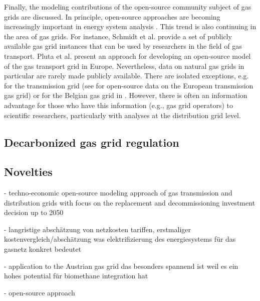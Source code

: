 Finally, the modeling contributions of the open-source community subject of gas grids are discussed. In principle, open-source approaches are becoming increasingly important in energy system analysis \cite{hulk2018transparency}. This trend is also continuing in the area of gas grids. For instance, Schmidt et al. \cite{schmidt2017gaslib} provide a set of publicly available gas grid instances that can be used by researchers in the field of gas transport. Pluta et al. \cite{pluta2022scigrid_gas} present an approach for developing an open-source model of the gas transport grid in Europe. Nevertheless, data on natural gas grids in particular are rarely made publicly available. There are isolated exceptions, e.g. for the transmission grid (see \cite{entsog} for open-source data on the European transmission gas grid) or for the Belgian gas grid in \cite{de2000gas}. However, there is often an information advantage for those who have this information (e.g., gas grid operators) to scientific researchers, particularly with analyses at the distribution grid level. 

\subsection{Decarbonized gas grid regulation}\label{tariffs}






\subsection{Novelties}\label{novelties}

- techno-economic open-source modeling approach of gas transmission and distribution grids with focus on the replacement and decommissioning investment decision up to 2050

- langristige abschätzung von netzkosten tariffen, erstmaliger kostenvergleich/abschätzung was elektrifizierung des energiesystems für das gasnetz konkret bedeutet

- application to the Austrian gas grid das besonders  spannend ist weil es ein hohes potential für biomethane integration hat

- open-source approach




